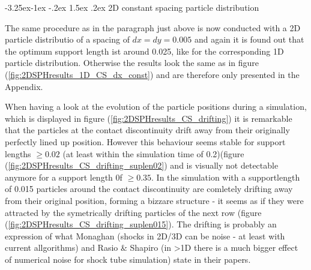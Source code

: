 \documentclass{report}
\makeatletter
\renewcommand\paragraph{\@startsection{paragraph}{4}{\z@}%
  {-3.25ex\@plus -1ex \@minus -.2ex}%
  {1.5ex \@plus .2ex}%
  {\normalfont\normalsize\bfseries}}
\makeatother
\begin{document}
\paragraph{2D constant spacing particle distribution}

The same procedure as in the paragraph just above is now conducted with a 2D particle distributio of a spacing of $dx=dy=0.005$ and again it is found out that the optimum support length ist around 0.025, like for the corresponding 1D particle distribution. Otherwise the results look the same as in figure (\ref{fig:2DSPHresults_1D_CS_dx_const}) and are therefore only presented in the Appendix.

When having a look at the evolution of the particle positions during a simulation, which is displayed in figure (\ref{fig:2DSPHresults_CS_drifting}) it is remarkable that the particles at the contact discontinuity drift away from their originally perfectly lined up position. However this behaviour seems stable for support lengths $\geq0.02$ (at least within the simulation time of 0.2)(figure (\ref{fig:2DSPHresults_CS_drifting_suplen02}) and is visually not detectable anymore for a support length 0f $\geq0.35$. In the simulation with a supportlength of 0.015 particles around the contact discontinuity are comletely drifting  away from their original position, forming a bizzare structure - it seems as if they were attracted by the symetrically drifting particles of the next row (figure (\ref{fig:2DSPHresults_CS_drifting_suplen015}). 
The drifting is probably an expression of what Monaghan \cite{Monaghan2005} (shocks in 2D/3D can be noise - at least with current allgorithms) and Rasio \& Shapiro \cite{Rasio1991} (in >1D there is a much bigger effect of numerical noise for shock tube simulation) state in their papers.
\end{document}
